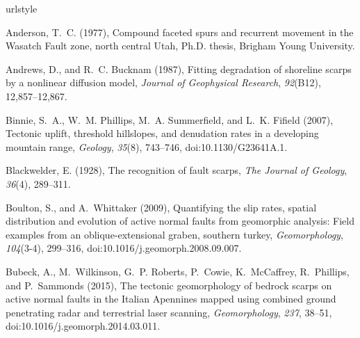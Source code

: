 %



\begin{thebibliography}{50}
\providecommand{\natexlab}[1]{#1}
\expandafter\ifx\csname urlstyle\endcsname\relax
  \providecommand{\doi}[1]{doi:\discretionary{}{}{}#1}\else
  \providecommand{\doi}{doi:\discretionary{}{}{}\begingroup
  \urlstyle{rm}\Url}\fi

Anderson, T.~C. (1977), {Compound faceted spurs and recurrent movement in the
  Wasatch Fault zone, north central Utah}, Ph.D. thesis, Brigham Young
  University.

Andrews, D., and R.~C. Bucknam (1987), Fitting degradation of shoreline scarps
  by a nonlinear diffusion model, \textit{Journal of Geophysical Research},
  \textit{92}(B12), 12,857--12,867.

Binnie, S.~A., W.~M. Phillips, M.~A. Summerfield, and L.~K. Fifield (2007),
  Tectonic uplift, threshold hillslopes, and denudation rates in a developing
  mountain range, \textit{Geology}, \textit{35}(8), 743--746,
  \doi{10.1130/G23641A.1}.

Blackwelder, E. (1928), The recognition of fault scarps, \textit{The Journal of
  Geology}, \textit{36}(4), 289--311.

Boulton, S., and A.~Whittaker (2009), Quantifying the slip rates, spatial
  distribution and evolution of active normal faults from geomorphic analysis:
  Field examples from an oblique-extensional graben, southern turkey,
  \textit{Geomorphology}, \textit{104}(3-4), 299--316,
  \doi{10.1016/j.geomorph.2008.09.007}.

Bubeck, A., M.~Wilkinson, G.~P. Roberts, P.~Cowie, K.~McCaffrey, R.~Phillips,
  and P.~Sammonds (2015), {The tectonic geomorphology of bedrock scarps on
  active normal faults in the Italian Apennines mapped using combined ground
  penetrating radar and terrestrial laser scanning}, \textit{Geomorphology},
  \textit{237}, 38--51, \doi{10.1016/j.geomorph.2014.03.011}.


\end{thebibliography}
